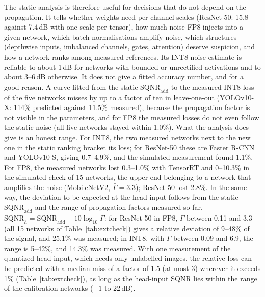\documentclass[pdflatex,sn-mathphys-num]{sn-jnl}%
\theoremstyle{thmstyleone}%
\theoremstyle{thmstyletwo}%
\theoremstyle{thmstylethree}%
\begin{document}
The static analysis is therefore useful for decisions that do not depend on the propagation. It tells whether weights need per-channel scales (ResNet-50: 15.8 against 7.4\,dB with one scale per tensor), how much noise FP8 injects into a given network, which batch normalisations amplify noise, which structures (depthwise inputs, imbalanced channels, gates, attention) deserve suspicion, and how a network ranks among measured references. Its INT8 noise estimate is reliable to about 1\,dB for networks with bounded or unrectified activations and to about 3--6\,dB otherwise. It does not give a fitted accuracy number, and for a good reason. A curve fitted from the static $\mathrm{SQNR}_\text{add}$ to the measured INT8 loss of the five networks misses by up to a factor of ten in leave-one-out (YOLOv10-X: 114\% predicted against 11.5\% measured), because the propagation factor is not visible in the parameters, and for FP8 the measured losses do not even follow the static noise (all five networks stayed within 1.0\%). What the analysis does give is an honest range. For INT8, the two measured networks next to the new one in the static ranking bracket its loss; for ResNet-50 these are Faster R-CNN and YOLOv10-S, giving 0.7--4.9\%, and the simulated measurement found 1.1\%. For FP8, the measured networks lost 0.3--1.0\% with TensorRT and 0--10.3\% in the simulated check of 15 networks, the upper end belonging to a network that amplifies the noise (MobileNetV2, $\bar\Gamma=3.3$); ResNet-50 lost 2.8\%. In the same way, the deviation to be expected at the head input follows from the static $\mathrm{SQNR}_\text{add}$ and the range of propagation factors measured so far, $\mathrm{SQNR}_h=\mathrm{SQNR}_\text{add}-10\log_{10}\bar\Gamma$: for ResNet-50 in FP8, $\bar\Gamma$ between 0.11 and 3.3 (all 15 networks of Table~\ref{tab:extcheck}) gives a relative deviation of 9--48\% of the signal, and 25.1\% was measured; in INT8, with $\bar\Gamma$ between 0.09 and 6.9, the range is 5--42\%, and 14.3\% was measured. With one measurement of the quantized head input, which needs only unlabelled images, the relative loss can be predicted with a median miss of a factor of 1.5 (at most 3) wherever it exceeds 1\% (Table~\ref{tab:extcheck}), as long as the head-input SQNR lies within the range of the calibration networks ($-1$ to 22\,dB).
\end{document}
